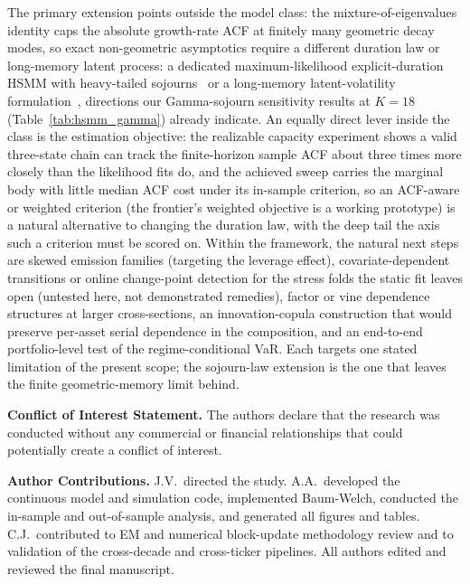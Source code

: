 The primary extension points outside the model class: the mixture-of-eigenvalues identity caps the absolute growth-rate ACF at finitely many geometric decay modes, so exact non-geometric asymptotics require a different duration law or long-memory latent process: a dedicated maximum-likelihood explicit-duration HSMM with heavy-tailed sojourns~\cite{yu2010hidden, bulla2006stylized} or a long-memory latent-volatility formulation~\cite{nystrup2017long}, directions our Gamma-sojourn sensitivity results at $K = 18$ (Table~\ref{tab:hsmm_gamma}) already indicate. An equally direct lever inside the class is the estimation objective: the realizable capacity experiment shows a valid three-state chain can track the finite-horizon sample ACF about three times more closely than the likelihood fits do, and the achieved sweep carries the marginal body with little median ACF cost under its in-sample criterion, so an ACF-aware or weighted criterion (the frontier's weighted objective is a working prototype) is a natural alternative to changing the duration law, with the deep tail the axis such a criterion must be scored on. Within the framework, the natural next steps are skewed emission families (targeting the leverage effect), covariate-dependent transitions or online change-point detection for the stress folds the static fit leaves open (untested here, not demonstrated remedies), factor or vine dependence structures at larger cross-sections, an innovation-copula construction that would preserve per-asset serial dependence in the composition, and an end-to-end portfolio-level test of the regime-conditional VaR. Each targets one stated limitation of the present scope; the sojourn-law extension is the one that leaves the finite geometric-memory limit behind.

\medskip
\noindent\textbf{Conflict of Interest Statement.} The authors declare that the research was conducted without any commercial or financial relationships that could potentially create a conflict of interest.

\medskip
\noindent\textbf{Author Contributions.} J.V.\ directed the study. A.A.\ developed the continuous model and simulation code, implemented Baum-Welch, conducted the in-sample and out-of-sample analysis, and generated all figures and tables. C.J.\ contributed to EM and numerical block-update methodology review and to validation of the cross-decade and cross-ticker pipelines. All authors edited and reviewed the final manuscript.

